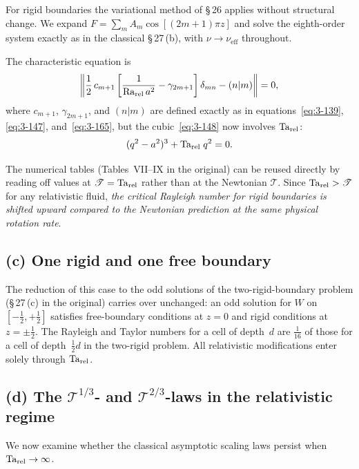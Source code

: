 For rigid boundaries the variational method of \S\,26 applies without
structural change.  We expand $F = \sum_m A_m \cos[(2m+1)\pi z]$ and
solve the eighth-order system exactly as in the classical \S\,27\,(b),
with $\nu \to \nu_{\mathrm{eff}}$ throughout.

The characteristic equation is
\begin{equation}\label{eq:rel-3-159}
  \left\|\frac{1}{2}\,c_{m+1}
    \left[\frac{1}{\mathrm{Ra}_{\mathrm{rel}}\,a^2} - \gamma_{2m+1}\right]
    \delta_{mn} - (n|m)\right\| = 0,
\end{equation}
where $c_{m+1}$, $\gamma_{2m+1}$, and $(n|m)$ are defined exactly as
in equations~\eqref{eq:3-139}, \eqref{eq:3-147}, and~\eqref{eq:3-165},
but the cubic~\eqref{eq:3-148} now involves $\mathrm{Ta}_{\mathrm{rel}}$:
\begin{equation}\label{eq:rel-3-148}
  (q^2 - a^2)^3 + \mathrm{Ta}_{\mathrm{rel}}\;q^2 = 0.
\end{equation}

The numerical tables (Tables~VII--IX in the original) can be reused
directly by reading off values at $\mathscr{T} = \mathrm{Ta}_{\mathrm{rel}}$ rather than at
the Newtonian $\mathscr{T}$.  Since $\mathrm{Ta}_{\mathrm{rel}} > \mathscr{T}$ for any
relativistic fluid, \emph{the critical Rayleigh number for rigid
boundaries is shifted upward compared to the Newtonian prediction at the
same physical rotation rate}.

\subsection*{(c) One rigid and one free boundary}

The reduction of this case to the odd solutions of the two-rigid-boundary
problem (\S\,27\,(c) in the original) carries over unchanged: an odd
solution for $W$ on $[-\tfrac12,+\tfrac12]$ satisfies free-boundary
conditions at $z = 0$ and rigid conditions at $z = \pm\tfrac12$.  The
Rayleigh and Taylor numbers for a cell of depth~$d$ are $\tfrac{1}{16}$
of those for a cell of depth~$\tfrac12 d$ in the two-rigid problem.
All relativistic modifications enter solely through $\mathrm{Ta}_{\mathrm{rel}}$.

\subsection*{(d) The $\mathscr{T}^{1/3}$- and $\mathscr{T}^{2/3}$-laws in the relativistic regime}

We now examine whether the classical asymptotic scaling laws persist
when $\mathrm{Ta}_{\mathrm{rel}} \to \infty$.

